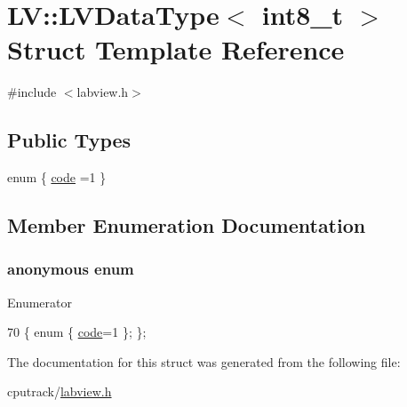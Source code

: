 \hypertarget{struct_l_v_1_1_l_v_data_type_3_01int8__t_01_4}{}\section{LV\+:\+:L\+V\+Data\+Type$<$ int8\+\_\+t $>$ Struct Template Reference}
\label{struct_l_v_1_1_l_v_data_type_3_01int8__t_01_4}


{\ttfamily \#include $<$labview.\+h$>$}

\subsection*{Public Types}
\begin{DoxyCompactItemize}
\item 
enum \{ \hyperlink{struct_l_v_1_1_l_v_data_type_3_01int8__t_01_4_a68b267b047f25a1bcea3edf0693df98aa75d889da8cac0b17b2e0974ca087444d}{code} =1
 \}
\end{DoxyCompactItemize}


\subsection{Member Enumeration Documentation}
\subsubsection[{\texorpdfstring{anonymous enum}{anonymous enum}}]{\setlength{\rightskip}{0pt plus 5cm}anonymous enum}\hypertarget{struct_l_v_1_1_l_v_data_type_3_01int8__t_01_4_a68b267b047f25a1bcea3edf0693df98a}{}\label{struct_l_v_1_1_l_v_data_type_3_01int8__t_01_4_a68b267b047f25a1bcea3edf0693df98a}
\begin{Desc}
\item[Enumerator]\par
\begin{description}
\item[{\em 
code\hypertarget{struct_l_v_1_1_l_v_data_type_3_01int8__t_01_4_a68b267b047f25a1bcea3edf0693df98aa75d889da8cac0b17b2e0974ca087444d}{}\label{struct_l_v_1_1_l_v_data_type_3_01int8__t_01_4_a68b267b047f25a1bcea3edf0693df98aa75d889da8cac0b17b2e0974ca087444d}
}]\end{description}
\end{Desc}

\begin{DoxyCode}
70 \{ \textcolor{keyword}{enum} \{ \hyperlink{struct_l_v_1_1_l_v_data_type_3_01int8__t_01_4_a68b267b047f25a1bcea3edf0693df98aa75d889da8cac0b17b2e0974ca087444d}{code}=1 \}; \};
\end{DoxyCode}


The documentation for this struct was generated from the following file\+:\begin{DoxyCompactItemize}
\item 
cputrack/\hyperlink{labview_8h}{labview.\+h}\end{DoxyCompactItemize}
